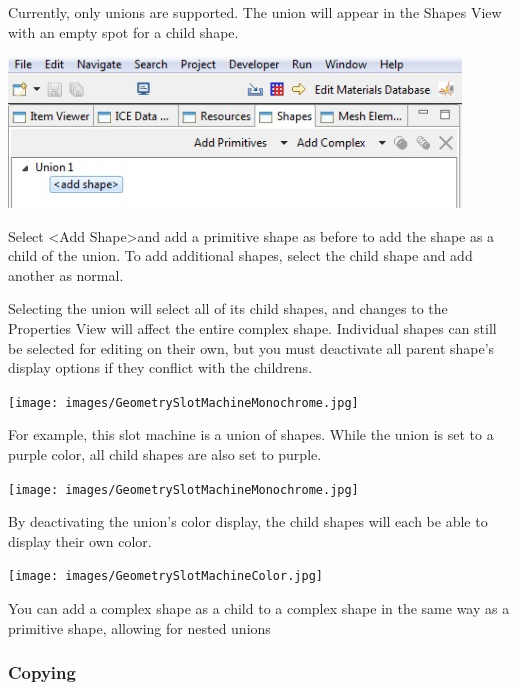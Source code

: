 Currently, only unions are supported. The union will appear in the Shapes View
with an empty spot for a child shape. 

\begin{center}
\includegraphics[width=12cm]{images/GeometryUnionAddShape.jpg}
\end{center}

Select \textless Add Shape\textgreater and add a primitive shape as before to
add the shape as a child of the union. To add additional shapes, select the
child shape and add another as normal.

Selecting the union will select all of its child shapes, and changes to the
Properties View will affect the entire complex shape. Individual shapes can
still be selected for editing on their own, but you must deactivate all parent
shape's display options if they conflict with the childrens.

\begin{center}
\texttt{[image: images/GeometrySlotMachineMonochrome.jpg]}
\end{center}

For example, this slot machine is a union of shapes. While the union is set to a
purple color, all child shapes are also set to purple. 

\begin{center}
\texttt{[image: images/GeometrySlotMachineMonochrome.jpg]}
\end{center}

By deactivating the union's color display, the child shapes will each be able to
display their own color.

\begin{center}
\texttt{[image: images/GeometrySlotMachineColor.jpg]}
\end{center}

You can add a complex shape as a child to a complex shape in the same way as a
primitive shape, allowing for nested unions

\subsubsection{Copying}

